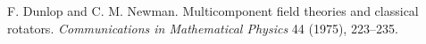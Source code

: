
 F. Dunlop and C. M. Newman. Multicomponent field theories and classical rotators. \emph{Communications in Mathematical Physics} 44 (1975), 223--235. %
